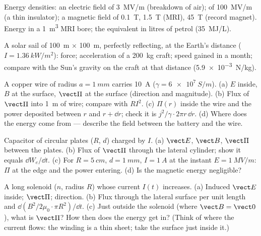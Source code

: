 \begin{exercise}[$\star$]\label{exo:b2:poynting-vector:3}
Energy densities: an electric field of \qty{3}{MV/m} (breakdown of air);
of \qty{100}{MV/m} (a thin insulator); a magnetic field of \qty{0.1}{T},
\qty{1.5}{T} (MRI), \qty{45}{T} (record magnet). Energy in a \qty{1}{m^3} MRI
bore; the equivalent in litres of petrol (\qty{35}{MJ/L}).
\end{exercise}

\begin{exercise}[$\star$]\label{exo:b2:poynting-vector:4}
A solar sail of \qty{100}{m} $\times$ \qty{100}{m}, perfectly reflecting, at
the Earth's distance ($I = \qty{1.36}{kW/m^2}$): force; acceleration of a
\qty{200}{kg} craft; speed gained in a month; compare with the Sun's
gravity on the craft at that distance (\qty{5.9e-3}{N/kg}).
\end{exercise}

\begin{exercise}[$\star\star$]\label{exo:b2:poynting-vector:5}
A copper wire of radius $a = \qty{1}{mm}$ carries \qty{10}{A} ($\gamma =
\qty{6e7}{S/m}$). (a) $E$ inside, $B$ at the surface, $\vect\Pi$ at the
surface (direction and magnitude). (b) Flux of $\vect\Pi$ into \qty{1}{m}
of wire; compare with $RI^2$. (c) $\Pi(r)$ inside the wire and the power
deposited between $r$ and $r + \dd r$; check it is $j^2/\gamma\cdot2\pi r\,\dd r$.
(d) Where does the energy come from --- describe the field between
the battery and the wire.
\end{exercise}

\begin{exercise}[$\star\star$]\label{exo:b2:poynting-vector:6}
Capacitor of circular plates ($R$, $d$) charged by $I$. (a) $\vect E$, $\vect B$,
$\vect\Pi$ between the plates. (b) Flux of $\vect\Pi$ through the lateral
cylinder; show it equals $\dd W_e/\dd t$. (c) For $R = \qty{5}{cm}$, $d =
\qty{1}{mm}$, $I = \qty{1}{A}$ at the instant $E = \qty{1}{MV/m}$: $\Pi$ at the
edge and the power entering. (d) Is the magnetic energy negligible?
\end{exercise}

\begin{exercise}[$\star\star$]\label{exo:b2:poynting-vector:7}
A long solenoid ($n$, radius $R$) whose current $I(t)$ increases. (a)
Induced $\vect E$ inside; $\vect\Pi$; direction. (b) Flux through the
lateral surface per unit length and $\dd(B^2/2\mu_0\cdot\pi R^2)/\dd t$. (c)
Just outside the solenoid (where $\vect B = \vect 0$), what is $\vect\Pi$?
How then does the energy get in? (Think of where the current flows:
the winding is a thin sheet; take the surface just inside it.)
\end{exercise}

